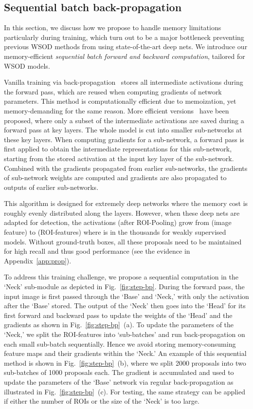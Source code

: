 \documentclass[10pt,twocolumn,letterpaper]{article}
\begin{document}
\subsection{Sequential batch back-propagation}
\label{sec:step-bp}
In this section, we discuss how we propose to handle memory limitations particularly during training, which turn out to be a major bottleneck preventing previous WSOD methods from using state-of-the-art deep nets. We introduce our  memory-efficient \emph{sequential batch forward and backward computation}, tailored for WSOD models. 

Vanilla training via back-propagation~\cite{Rumelhart}  stores all intermediate activations during the forward pass, which are  reused when computing gradients of network parameters. This method is computationally efficient due to memoization, yet memory-demanding for the same reason. More efficient versions~\cite{Kokkinos17,ChenXZG16} have been proposed, where only a subset of the intermediate activations are saved during a forward pass at key layers. The whole model is cut into smaller sub-networks at these key layers. When computing gradients for a sub-network, a forward pass is first applied  to obtain the intermediate representations for this sub-network, starting from the stored activation at the input key layer of the sub-network. Combined with the gradients propagated from earlier sub-networks, the gradients of sub-network weights are computed and gradients are also propagated to outputs of earlier sub-networks.

This algorithm is designed for extremely deep networks where the memory cost is roughly evenly distributed along the layers. However, when these deep nets are adapted for detection, the activations (after ROI-Pooling) grow from  (image feature) to  (ROI-features) where  is in the thousands for weakly supervised models. Without ground-truth boxes, all these proposals  need to be maintained for high recall and thus good performance (see the evidence in Appendix~\ref{app:prop}).

To address this training challenge, we propose a sequential computation in the `Neck' sub-module as depicted in Fig.~\ref{fig:step-bp}. During the forward pass, the input image is first passed through the `Base' and `Neck,' with only the activation  after the `Base' stored. The output of the `Neck' then goes into the `Head' for its first forward and backward pass to update the weights of the `Head' and the gradients   as shown in Fig.~\ref{fig:step-bp}~(a). To update the parameters of the `Neck,' we split the ROI-features into `sub-batches' and run back-propagation on each small sub-batch sequentially. Hence we avoid storing memory-consuming feature maps and their gradients within the `Neck.' An example of this sequential method is shown in Fig.~\ref{fig:step-bp}~(b), where we split 2000 proposals into two sub-batches of 1000 proposals each. The gradient  is accumulated and used to  update the parameters of the `Base' network via regular back-propagation as illustrated in Fig.~\ref{fig:step-bp}~(c).  For testing, the same strategy can be applied if either the number of ROIs or the size of the `Neck' is too large.
\end{document}
